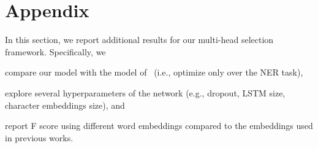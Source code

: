 \documentclass[review]{elsarticle}
\newcommand{\eg}{e.g., }
\newcommand{\ie}{i.e., }
\begin{document}

\pagebreak



\section*{Appendix}
\label{sec:supplement}
\setcounter{equation}{0}
\setcounter{figure}{0}
\setcounter{table}{0}
\setcounter{page}{1}
\makeatletter
\renewcommand{\theequation}{A\arabic{equation}}
\renewcommand{\thefigure}{A\arabic{figure}}
\renewcommand{\thetable}{A\arabic{table}}
\renewcommand{\bibnumfmt}[1]{[A#1]}
\renewcommand{\citenumfont}[1]{A#1}


In this section, we report additional results for our multi-head selection framework. Specifically, we 
\begin{enumerate*}[label=(\roman*)]
\item compare our model with the model of~\cite{lample:16} (\ie optimize only over the NER task),
\item explore several hyperparameters of the network (\eg dropout, LSTM size, character embeddings size), and
\item report F score using different word embeddings compared to the embeddings used in previous works.
\end{enumerate*}
\end{document}
